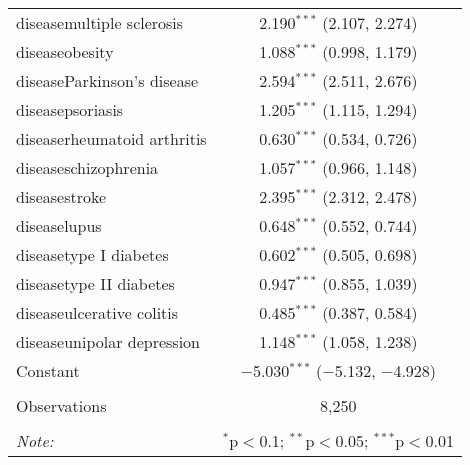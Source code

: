 \begin{table}[!htbp]
\begin{tabular}{@{\extracolsep{5pt}}lc}
  diseasemultiple sclerosis & 2.190$^{***}$ (2.107, 2.274) \\ 
  diseaseobesity & 1.088$^{***}$ (0.998, 1.179) \\ 
  diseaseParkinson's disease & 2.594$^{***}$ (2.511, 2.676) \\ 
  diseasepsoriasis & 1.205$^{***}$ (1.115, 1.294) \\ 
  diseaserheumatoid arthritis & 0.630$^{***}$ (0.534, 0.726) \\ 
  diseaseschizophrenia & 1.057$^{***}$ (0.966, 1.148) \\ 
  diseasestroke & 2.395$^{***}$ (2.312, 2.478) \\ 
  diseaselupus & 0.648$^{***}$ (0.552, 0.744) \\ 
  diseasetype I diabetes & 0.602$^{***}$ (0.505, 0.698) \\ 
  diseasetype II diabetes & 0.947$^{***}$ (0.855, 1.039) \\ 
  diseaseulcerative colitis & 0.485$^{***}$ (0.387, 0.584) \\ 
  diseaseunipolar depression & 1.148$^{***}$ (1.058, 1.238) \\ 
  Constant & $-$5.030$^{***}$ ($-$5.132, $-$4.928) \\ 
 \hline \\[-1.8ex] 
Observations & 8,250 \\ 
\hline 
\hline \\[-1.8ex] 
\textit{Note:}  & \multicolumn{1}{r}{$^{*}$p$<$0.1; $^{**}$p$<$0.05; $^{***}$p$<$0.01} \\ 
\end{tabular} 
\end{table} 
